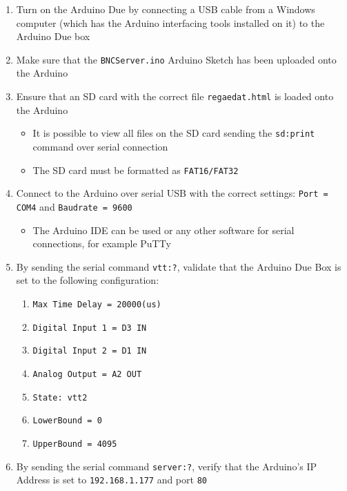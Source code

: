 \documentclass{article}
\begin{document}
        \begin{enumerate}[label=\textbf{\arabic*}]
            \item Turn on the Arduino Due by connecting a USB cable from a Windows computer (which has the Arduino interfacing tools installed on it) to the Arduino Due box
            \item Make sure that the \texttt{BNCServer.ino} Arduino Sketch has been uploaded onto the Arduino
            \item Ensure that an SD card with the correct file \texttt{regaedat.html} is loaded onto the Arduino
            \begin{itemize}
                \item It is possible to view all files on the SD card sending the \texttt{sd:print} command over serial connection
                \item The SD card must be formatted as \texttt{FAT16/FAT32}
            \end{itemize}
            \item Connect to the Arduino over serial USB with the correct settings: \texttt{Port = COM4} and \texttt{Baudrate = 9600}
            \begin{itemize}
                \item The Arduino IDE can be used or any other software for serial connections, for example PuTTy
            \end{itemize}
            \item By sending the serial command \texttt{vtt:?}, validate that the Arduino Due Box is set to the following configuration:
                \begin{enumerate}
                    \item \texttt{Max Time Delay = 20000(us)}
                    \item \texttt{Digital Input 1 = D3 IN}
                    \item \texttt{Digital Input 2 = D1 IN}
                    \item \texttt{Analog Output = A2 OUT}
                    \item \texttt{State: vtt2}
                    \item \texttt{LowerBound = 0}
                    \item \texttt{UpperBound = 4095}
                \end{enumerate}
            \item By sending the serial command \texttt{server:?}, verify that the Arduino's IP Address is set to \texttt{192.168.1.177} and port \texttt{80}

\end{enumerate}
\end{document}
